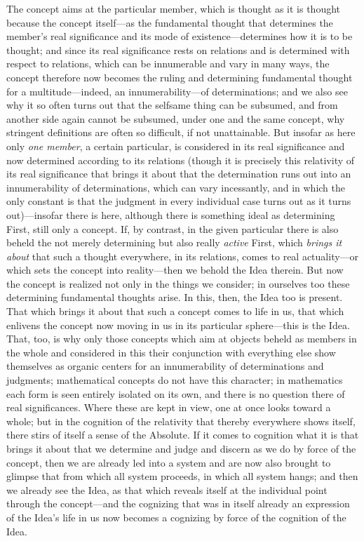\documentclass[12pt,a4paper]{book}
\begin{document}
The concept aims at the particular member, which is thought as it is thought because the
concept itself---as the fundamental thought that determines the member's real
significance and its mode of existence---determines how it is to be thought; and since
its real significance rests on relations and is determined with respect to relations,
which can be innumerable and vary in many ways, the concept therefore now becomes the
ruling and determining fundamental thought for a multitude---indeed, an
innumerability---of determinations; and we also see why it so often turns out that the
selfsame thing can be subsumed, and from another side again cannot be subsumed, under
one and the same concept, why stringent definitions are often so difficult, if not
unattainable. But insofar as here only \emph{one member}, a certain particular, is
considered in its real significance and now determined according to its relations
(though it is precisely this relativity of its real significance that brings it about
that the determination runs out into an innumerability of determinations, which can
vary incessantly, and in which the only constant is that the judgment in every
individual case turns out as it turns out)---insofar there is here, although there is
something ideal as determining First, still only a concept. If, by contrast, in the
given particular there is also beheld the not merely determining but also really
\emph{active} First, which \emph{brings it about} that such a thought everywhere, in its
relations, comes to real actuality---or which sets the concept into reality---then we
behold the Idea therein. But now the concept is realized not only in the things we
consider; in ourselves too these determining fundamental thoughts arise. In this, then,
the Idea too is present. That which brings it about that such a concept comes to life in
us, that which enlivens the concept now moving in us in its particular sphere---this is
the Idea. That, too, is why only those concepts which aim at objects beheld as members
in the whole and considered in this their conjunction with everything else show
themselves as organic centers for an innumerability of determinations and judgments;
mathematical concepts do not have this character; in mathematics each form is seen
entirely isolated on its own, and there is no question there of real significances.
Where these are kept in view, one at once looks toward a whole; but in the cognition of
the relativity that thereby everywhere shows itself, there stirs of itself a sense of
the Absolute. If it comes to cognition what it is that brings it about that we determine
and judge and discern as we do by force of the concept, then we are already led into a
system and are now also brought to glimpse that from which all system proceeds, in which
all system hangs; and then we already see the Idea, as that which reveals itself at the
individual point through the concept---and the cognizing that was in itself already an
expression of the Idea's life in us now becomes a cognizing by force of the cognition of
the Idea.
\end{document}
